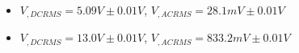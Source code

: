 \begin{itemize}
     \item $V_{, DCRMS}=5.09V\pm 0.01\unit{V}$, $V_{, ACRMS}=28.1mV\pm 0.01\unit{V}$ 
     \item $V_{, DCRMS}=13.0V\pm 0.01\unit{V}$, $V_{, ACRMS}=833.2mV\pm 0.01\unit{V}$\\
\end{itemize}
